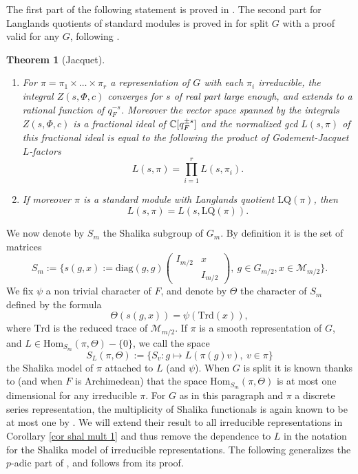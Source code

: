 \documentclass[11pt,letterpaper]{amsart}
\newcommand{\CM}{{\mathcal {M}}} \newcommand{\CN}{{\mathcal {N}}}\newcommand{\CO}{{\mathcal {O}}}\newcommand{\CP}{{\mathcal {P}}}
\newcommand{\Hom}{\mathrm{Hom}}
\newcommand{\trd}{{\mathrm{Trd}}}
\def\diag{\mathrm{diag}}
\theoremstyle{plain}
\newtheorem{thm}{Theorem}[section] \newtheorem{cor}[thm]{Corollary}
\numberwithin{equation}{section}
\begin{document}
The first part of the following statement is proved in \cite{GJ}. The second part for Langlands quotients of standard modules is proved in \cite[(2.3) Proposition, (3.4) Theorem]{Jprincipal} for split $G$ with a proof valid for any $G$, following \cite{GJ}. 

\begin{thm}[Jacquet]\label{thm ind J}
\begin{enumerate}
\item\label{J1} For $\pi=\pi_1\times \dots \times \pi_r$ a representation of $G$ with each $\pi_i$ irreducible, the integral $Z(s,\Phi,c)$ converges for $s$ of real part large enough, and extends to a rational function of $q_F^{-s}$. Moreover the vector space spanned by the integrals $Z(s,\Phi,c)$ is a fractional ideal of ${\mathbb {C}}[q_F^{\pm s}]$ and the normalized gcd $L(s,\pi)$ of this fractional ideal is equal to the following the product of Godement-Jacquet $L$-factors 
\[L(s,\pi)=\prod_{i=1}^r L(s,\pi_i).\]
\item\label{J2} If moreover $\pi$ is a standard module with Langlands quotient $\mathrm{LQ}(\pi)$, then
\[L(s,\pi)=L(s,\mathrm{LQ}(\pi)).\]
\end{enumerate}
\end{thm}

We now denote by $S_m$ the Shalika subgroup of $G_m$. By definition it is the set of matrices 
\[S_m:=\{s(g,x):=\diag(g,g) \begin{pmatrix} I_{m/2} & x \\ & I_{m/2}  \end{pmatrix}, \ g\in G_{m/2}, x\in \CM_{m/2}\}.\]
We fix $\psi$ a non trivial character of $F$, and denote by $\Theta$ the character of $S_m$ defined by the formula 
\[\Theta(s(g,x))=\psi(\trd(x)),\] where $\trd$ is the reduced trace of $\CM_{m/2}$. If $\pi$ is a smooth representation of $G$, and $L\in \Hom_{S_m}(\pi,\Theta)-\{0\}$, we call the space \[S_L(\pi,\Theta):=\{S_v:g\mapsto L(\pi(g)v), \ v\in \pi\}\] the Shalika model of $\pi$ attached to $L$ (and $\psi$). When $G$ is split it is known thanks to \cite{JR} (and \cite{AGJ} when $F$ is Archimedean) that the space 
$\Hom_{S_m}(\pi,\Theta)$ is at most one dimensional for any irreducible $\pi$. For $G$ as in this paragraph and $\pi$ a discrete series representation, the multiplicity of Shalika functionals is again known to be at most one by \cite{BW}. We will 
extend their result to all irreducible representations in Corollary \ref{cor shal mult 1} and thus remove the dependence to $L$ in the notation for the Shalika model of irreducible representations. The following generalizes the $p$-adic part of \cite[Proposition 3.1]{FJ}, and follows from its proof.
\end{document}
